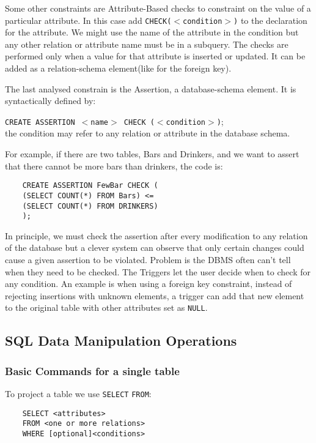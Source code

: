 \documentclass[a4page, 11pt]{article}
\theoremstyle{definition}
\begin{document}
Some other constraints are Attribute-Based checks to constraint on the value of a particular attribute. In this case add \texttt{CHECK($<$condition$>$)} to the declaration for the attribute. We might use the name of the attribute in the condition but any other relation or attribute name must be in a subquery.
The checks are performed only when a value for that attribute is inserted or updated.
It can be added as a relation-schema element(like for the foreign key). %

The last analysed constrain is the Assertion, a database-schema element. It is syntactically defined by: 

\texttt{CREATE ASSERTION $<$name$>$ CHECK ($<$condition$>$)};\\
 the condition may refer to any relation or attribute in the database schema.

For example, if there are two tables, Bars and Drinkers, and we want to assert that there cannot be more bars than drinkers, the code is:
\begin{lstlisting}
	CREATE ASSERTION FewBar CHECK (
	(SELECT COUNT(*) FROM Bars) <=
	(SELECT COUNT(*) FROM DRINKERS)
	);
\end{lstlisting}
In principle, we must check the assertion after every modification to any relation of the database but a clever system can observe that only certain changes could cause a given assertion to be violated. 
Problem is the DBMS often can't tell when they need to be checked. %
The Triggers let the user decide when to check for any condition.
An example is when using a foreign key constraint, instead of rejecting insertions with unknown elements, a trigger can add that new element to the original table with other attributes set as \texttt{NULL}.
\newpage
\subsection{SQL Data Manipulation Operations}

\subsubsection{Basic Commands for a single table}
To project a table we use \texttt{SELECT} \texttt{FROM}:

\begin{lstlisting}
	SELECT <attributes>
	FROM <one or more relations>
	WHERE [optional]<conditions>
\end{lstlisting}
\end{document}
